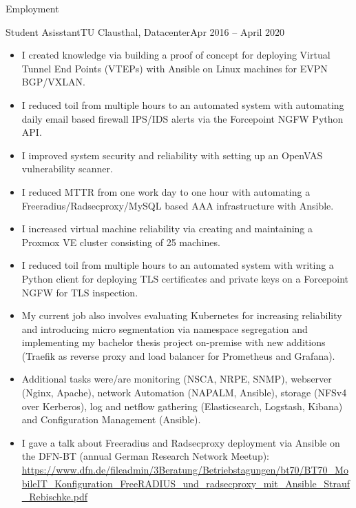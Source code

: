 \documentclass[]{mcdowellcv}
\begin{document}
\makeheader

\begin{cvsection}{Employment}
\begin{cvsubsection}{Student Asisstant}{TU Clausthal, Datacenter}{Apr 2016 -- April 2020}

\begin{itemize}
\item I created knowledge via building a proof of concept for deploying Virtual Tunnel End Points (VTEPs) with Ansible on Linux machines for EVPN BGP/VXLAN.
\item I reduced toil from multiple hours to an automated system with automating daily email based firewall IPS/IDS alerts via the Forcepoint NGFW Python API.
\item I improved system security and reliability with setting up an OpenVAS vulnerability scanner.
\item I reduced MTTR from one work day to one hour with automating a Freeradius/Radsecproxy/MySQL based AAA infrastructure with Ansible.
\item I increased virtual machine reliability via creating and maintaining a Proxmox VE cluster consisting of 25 machines.
\item I reduced toil from multiple hours to an automated system with writing a Python client for deploying TLS certificates and private keys on a Forcepoint NGFW for TLS inspection.
\item My current job also involves evaluating Kubernetes for increasing reliability and introducing micro segmentation via namespace segregation and implementing my bachelor thesis project on-premise with new additions (Traefik as reverse proxy and load balancer for Prometheus and Grafana).
\item Additional tasks were/are monitoring (NSCA, NRPE, SNMP), webserver (Nginx, Apache), network Automation (NAPALM, Ansible), storage (NFSv4 over Kerberos), log and netflow gathering (Elasticsearch, Logstash, Kibana) and Configuration Management (Ansible).
\item I gave a talk about Freeradius and Radsecproxy deployment via Ansible on the DFN-BT (annual German Research Network Meetup): \url{https://www.dfn.de/fileadmin/3Beratung/Betriebstagungen/bt70/BT70_MobileIT_Konfiguration_FreeRADIUS_und_radsecproxy_mit_Ansible_Strauf_Rebischke.pdf}
\end{itemize}
\end{cvsubsection}


\end{cvsection}
\end{document}
